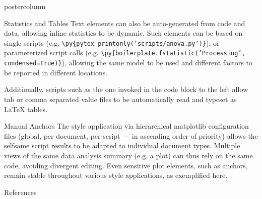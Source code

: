 \documentclass[xcolor=table]{beamer}
\begin{document}
\begin{frame}
\begin{columns}
\begin{column}{.57\textwidth}
\begin{beamercolorbox}[center]{postercolumn}
\begin{minipage}{.98\textwidth}
{\begin{myblock}{Statistics and Tables}
						Text elements can also be auto-generated from code and data, allowing inline statistics to be dynamic.
						Such elements can be based on single scripts (e.g. \colorbox{elg}{\texttt{\textbackslash py\{pytex\_printonly('scripts/anova.py')\}}}), or parameterized script calls (e.g. \colorbox{elg}{\texttt{\textbackslash py\{boilerplate.fstatistic('Processing', condensed=True)\}}}), allowing the same model to be used and different factors to be reported in different locations.
						\vspace{.7em}

						\begin{minipage}{.7\textwidth}
							\begin{figure}
							\end{figure}
						\end{minipage}\hfill
						\begin{minipage}{.25\textwidth}
							Additionally, scripts such as the one invoked in the code block to the left allow tab or comma separated value files to be automatically read and typeset as \LaTeX{} tables.
						\end{minipage}
					\end{myblock}\vfill
					\begin{myblock}{Manual Anchors}
						\vspace{0.3em}
						\vspace{0.9em}
						The style application via hierarchical matplotlib configuration files (global, per-document, per-script --- in ascending order of priority) allows the selfsame script results to be adapted to individual document types.
						Multiple views of the same data analysis summary (e.g. a plot) can thus rely on the same code, avoiding divergent editing.
						Even sensitive plot elements, such as anchors, remain stable throughout various style applications, as exemplified here.
					\end{myblock}\vfill
					\begin{myblock}{References}
                                                \vspace{-0.8em}
                                                \begin{multicols}{2}

\end{multicols}
\end{myblock}}
\end{minipage}
\end{beamercolorbox}
\end{column}
\end{columns}
\end{frame}
\end{document}

